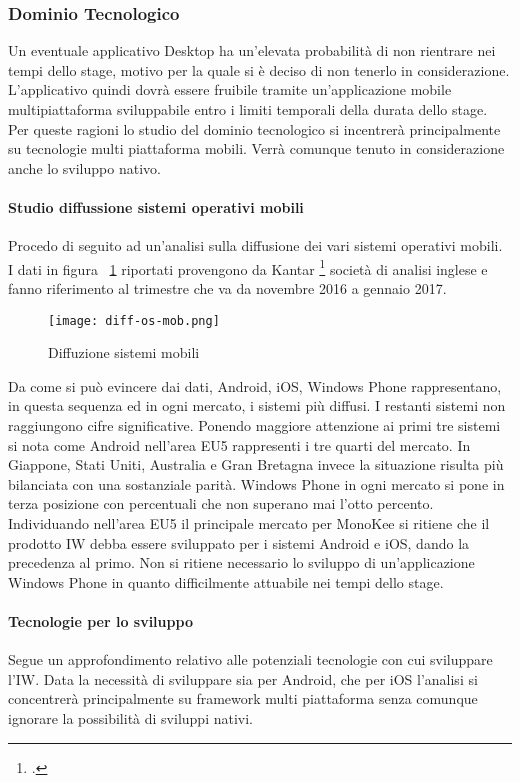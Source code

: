 \subsubsection{Dominio Tecnologico}
Un eventuale applicativo Desktop ha un’elevata probabilità di non rientrare nei tempi dello stage, motivo per la quale si è deciso di non tenerlo in considerazione. L’applicativo quindi dovrà essere fruibile tramite un’applicazione mobile multipiattaforma sviluppabile entro i limiti temporali della durata dello stage. 
Per queste ragioni lo studio del dominio tecnologico si incentrerà principalmente su tecnologie multi piattaforma mobili. Verrà comunque tenuto in considerazione anche lo sviluppo nativo.
\paragraph{Studio diffussione sistemi operativi mobili}
Procedo di seguito ad un’analisi sulla diffusione dei vari sistemi operativi mobili.
I dati in figura ~\ref{fig:diff-os-mob} riportati provengono da Kantar \footcite{site:kantar-study} società di analisi inglese e fanno riferimento al trimestre che va da novembre 2016 a gennaio 2017.
\begin{figure}[!h] 
    \centering
    \texttt{[image: diff-os-mob.png]} 
    \caption{Diffuzione sistemi mobili}
    \label{fig:diff-os-mob} 
\end{figure}
Da come si può evincere dai dati, Android, iOS, Windows Phone rappresentano, in questa sequenza ed in ogni mercato, i sistemi più diffusi. I restanti sistemi non raggiungono cifre significative. Ponendo maggiore attenzione ai primi tre sistemi si nota come Android nell’area EU5 rappresenti i tre quarti del mercato. In Giappone, Stati Uniti, Australia e Gran Bretagna invece la situazione risulta più bilanciata con una sostanziale parità. Windows Phone in ogni mercato si pone in terza posizione con percentuali che non superano mai l’otto percento. Individuando nell’area EU5 il principale mercato per MonoKee si ritiene che il prodotto IW debba essere sviluppato per i sistemi Android e iOS, dando la precedenza al primo. Non si ritiene necessario lo sviluppo di un’applicazione Windows Phone in quanto difficilmente attuabile nei tempi dello stage. 
\paragraph{Tecnologie per lo sviluppo}
Segue un approfondimento relativo alle potenziali tecnologie con cui sviluppare l’IW. Data la necessità di sviluppare sia per Android, che per iOS l’analisi si concentrerà principalmente su framework multi piattaforma senza comunque ignorare la possibilità di sviluppi nativi.
